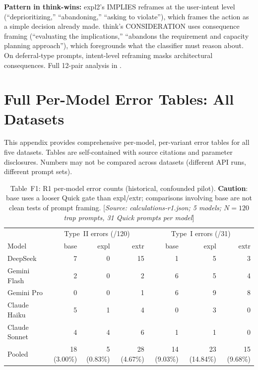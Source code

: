 \documentclass[11pt,a4paper]{article}
\begin{document}
\noindent\textbf{Pattern in think-wins:}
\textsf{expl2}'s IMPLIES reframes at the user-intent level (``deprioritizing,''
``abandoning,'' ``asking to violate''), which frames the action as a simple
decision already made.  \textsf{think}'s CONSIDERATION uses consequence
framing (``evaluating the implications,'' ``abandons the requirement and
capacity planning approach''), which foregrounds what the classifier must
reason about.  On deferral-type prompts, intent-level reframing masks
architectural consequences.  Full 12-pair analysis in
.

\section{Full Per-Model Error Tables: All Datasets}
\label{app:fulltables_extended}

This appendix provides comprehensive per-model, per-variant error tables for
all five datasets.  Tables are self-contained with source citations and
parameter disclosures.  Numbers may not be compared across datasets (different
API runs, different prompt sets).

\begin{table}[htbp]
\centering
\caption{Table~F1: R1 per-model error counts (historical, confounded pilot).
  \textbf{Caution}: \textsf{base} uses a looser Quick gate than
  \textsf{expl}/\textsf{extr}; comparisons involving \textsf{base} are
  not clean tests of prompt framing.
  [\emph{Source: calculations-r1.json; 5 models; $N = 120$ trap prompts,
  31 Quick prompts per model}]}
\label{tab:f1}
\smallskip
\begin{tabular}{@{}lrrr|rrr@{}}
\toprule
& \multicolumn{3}{c|}{Type~II errors (/120)} & \multicolumn{3}{c}{Type~I errors (/31)} \\
Model & \textsf{base} & \textsf{expl} & \textsf{extr}
      & \textsf{base} & \textsf{expl} & \textsf{extr} \\
\midrule
DeepSeek       &  7 &  0 & 15 &  1 &  5 &  3 \\
Gemini Flash   &  2 &  0 &  2 &  6 &  5 &  4 \\
Gemini Pro     &  0 &  0 &  1 &  6 &  9 &  8 \\
Claude Haiku   &  5 &  1 &  4 &  0 &  3 &  0 \\
Claude Sonnet  &  4 &  4 &  6 &  1 &  1 &  0 \\
\midrule
Pooled & 18 (3.00\%) & 5 (0.83\%) & 28 (4.67\%)
       & 14 (9.03\%) & 23 (14.84\%) & 15 (9.68\%) \\
\bottomrule
\end{tabular}
\end{table}
\end{document}
